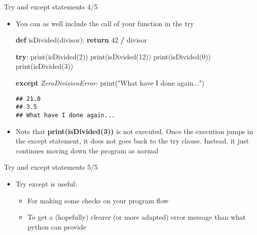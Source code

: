 \documentclass[
  8pt,
  ignorenonframetext,
]{beamer}
\newenvironment{Shaded}{\begin{snugshade}}{\end{snugshade}}
\newcommand{\BuiltInTok}[1]{#1}
\newcommand{\ControlFlowTok}[1]{\textcolor[rgb]{0.13,0.29,0.53}{\textbf{#1}}}
\newcommand{\DecValTok}[1]{\textcolor[rgb]{0.00,0.00,0.81}{#1}}
\newcommand{\KeywordTok}[1]{\textcolor[rgb]{0.13,0.29,0.53}{\textbf{#1}}}
\newcommand{\NormalTok}[1]{#1}
\newcommand{\OperatorTok}[1]{\textcolor[rgb]{0.81,0.36,0.00}{\textbf{#1}}}
\newcommand{\PreprocessorTok}[1]{\textcolor[rgb]{0.56,0.35,0.01}{\textit{#1}}}
\newcommand{\StringTok}[1]{\textcolor[rgb]{0.31,0.60,0.02}{#1}}
\providecommand{\tightlist}{%
  \setlength{\itemsep}{0pt}\setlength{\parskip}{0pt}}
\begin{document}
\begin{frame}[fragile]{Try and except statements 4/5}
\protect\hypertarget{try-and-except-statements-45}{}
\begin{itemize}[<+->]
\item
  You can as well include the call of your function in the try

\begin{Shaded}
\begin{Highlighting}[]
\KeywordTok{def}\NormalTok{ isDivided(divisor):}
  \ControlFlowTok{return} \DecValTok{42} \OperatorTok{/}\NormalTok{ divisor}

\ControlFlowTok{try}\NormalTok{:}
  \BuiltInTok{print}\NormalTok{(isDivided(}\DecValTok{2}\NormalTok{))}
  \BuiltInTok{print}\NormalTok{(isDivided(}\DecValTok{12}\NormalTok{))}
  \BuiltInTok{print}\NormalTok{(isDivided(}\DecValTok{0}\NormalTok{))}
  \BuiltInTok{print}\NormalTok{(isDivided(}\DecValTok{3}\NormalTok{))}

\ControlFlowTok{except} \PreprocessorTok{ZeroDivisionError}\NormalTok{:}
  \BuiltInTok{print}\NormalTok{(}\StringTok{"What have I done again..."}\NormalTok{)}
\end{Highlighting}
\end{Shaded}

\begin{verbatim}
## 21.0
## 3.5
## What have I done again...
\end{verbatim}
\end{itemize}

\begin{itemize}[<+->]
\tightlist
\item
  Note that \textbf{print(isDivided(3))} is not executed. Once the
  execution jumps in the except statement, it does not goes back to the
  try clause. Instead, it just continues moving down the program as
  normal
\end{itemize}
\end{frame}

\begin{frame}{Try and except statements 5/5}
\protect\hypertarget{try-and-except-statements-55}{}
\begin{itemize}
\tightlist
\item
  Try except is useful:

  \begin{itemize}
  \tightlist
  \item
    For making some checks on your program flow
  \item
    To get a (hopefully) clearer (or more adapted) error message than
    what python can provide
  \end{itemize}
\end{itemize}
\end{frame}
\end{document}
